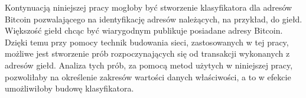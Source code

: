 \documentclass[12pt, oneside, final, openany]{mgr}
\begin{document}
\indent Kontynuacją niniejszej pracy mogłoby być stworzenie klasyfikatora dla adresów Bitcoin pozwalającego na identyfikację adresów należących, na przykład, do giełd. Większość giełd chcąc być wiarygodnym publikuje posiadane adresy Bitcoin. Dzięki temu przy pomocy technik budowania sieci, zastosowanych w tej pracy, możliwe jest stworzenie prób rozpoczynających się od transakcji wykonanych z adresów giełd. Analiza tych prób, za pomocą metod użytych w niniejszej pracy, pozwoliłaby na określenie zakresów wartości danych właściwości, a to w efekcie umożliwiłoby budowę klasyfikatora.




\listoffigures
\listoftables
\end{document}

